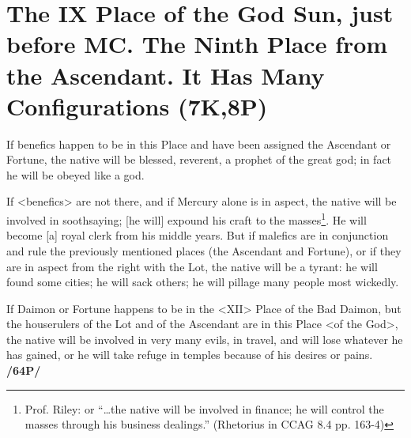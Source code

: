 \section*{The IX Place of the God Sun, just before MC. The Ninth 
Place from the Ascendant. It Has Many Configurations (7K,8P)}

If benefics happen to be in this Place and have been assigned the Ascendant or Fortune, the native will be blessed, reverent, a prophet of the great god; in fact he will be obeyed like a god.

If <benefics> are not there, and if Mercury alone is in aspect, the native will be involved in soothsaying; [he will] expound his craft to the masses\footnote{Prof. Riley: or “…the native will be involved in finance; he will control the masses through his business dealings.” (Rhetorius in CCAG 8.4 pp. 163-4)}. He will become [a] royal clerk from his middle years. But if malefics are in conjunction and rule the previously mentioned places (the Ascendant and Fortune), or if they are in aspect from the right with the Lot, the native will be a tyrant: he will found some cities; he will sack others; he will pillage many people most wickedly. 

If Daimon or Fortune happens to be in the <XII> Place of the Bad Daimon, but the houserulers of the Lot and of the Ascendant are in this Place <of the God>, the native will be involved in very many evils, in travel, and will lose whatever he has gained, or he will take refuge in temples because of his desires or pains. \textbf{/64P/}

\newpage